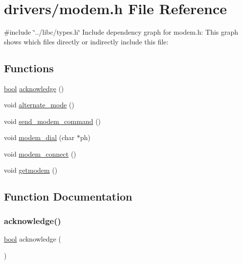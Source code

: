 \hypertarget{a00047}{}\section{drivers/modem.h File Reference}
\label{a00047}
{\ttfamily \#include \char`\"{}../libc/types.\+h\char`\"{}}\newline
Include dependency graph for modem.\+h\+:
This graph shows which files directly or indirectly include this file\+:
\subsection*{Functions}
\begin{DoxyCompactItemize}
\item 
\hyperlink{a00140_af6a258d8f3ee5206d682d799316314b1_af6a258d8f3ee5206d682d799316314b1}{bool} \hyperlink{a00047_a8529dba543149138317e327931bf5a5c_a8529dba543149138317e327931bf5a5c}{acknowledge} ()
\item 
void \hyperlink{a00047_ace378eaa88c0b7f0cdafe97d064e36fb_ace378eaa88c0b7f0cdafe97d064e36fb}{alternate\+\_\+mode} ()
\item 
void \hyperlink{a00047_adf147e13a3c0b23148f4eb1db184f68d_adf147e13a3c0b23148f4eb1db184f68d}{send\+\_\+modem\+\_\+command} ()
\item 
void \hyperlink{a00047_ab1123a026be8f7d0ece72e2813222da0_ab1123a026be8f7d0ece72e2813222da0}{modem\+\_\+dial} (char $\ast$ph)
\item 
void \hyperlink{a00047_a283a7e4b715971478687b2d7547780cb_a283a7e4b715971478687b2d7547780cb}{modem\+\_\+connect} ()
\item 
void \hyperlink{a00047_a5e56e19ccc8f36690d515dd09948db10_a5e56e19ccc8f36690d515dd09948db10}{getmodem} ()
\end{DoxyCompactItemize}


\subsection{Function Documentation}
\mbox{\label{a00047_a8529dba543149138317e327931bf5a5c_a8529dba543149138317e327931bf5a5c}} 
\subsubsection{\texorpdfstring{acknowledge()}{acknowledge()}}
{\footnotesize\ttfamily \hyperlink{a00140_af6a258d8f3ee5206d682d799316314b1_af6a258d8f3ee5206d682d799316314b1}{bool} acknowledge (\begin{DoxyParamCaption}{ }\end{DoxyParamCaption})}



